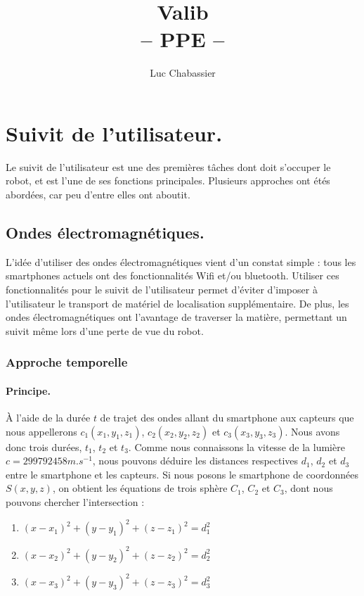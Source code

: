 \documentclass{article}
\title{Valib\\-- PPE --}
\author{Luc Chabassier}
\begin{document}
\maketitle
\tableofcontents

\section{Suivit de l'utilisateur.}
Le suivit de l'utilisateur est une des premières tâches dont doit s'occuper le robot, et est l'une de ses fonctions principales. Plusieurs approches ont étés abordées, car peu d'entre elles ont aboutit.

\subsection{Ondes électromagnétiques.}
L'idée d'utiliser des ondes électromagnétiques vient d'un constat simple : tous les smartphones actuels ont des fonctionnalités Wifi et/ou bluetooth. Utiliser ces fonctionnalités pour le suivit de l'utilisateur permet d'éviter d'imposer à l'utilisateur le transport de matériel de localisation supplémentaire. De plus, les ondes électromagnétiques ont l'avantage de traverser la matière, permettant un suivit même lors d'une perte de vue du robot.

\subsubsection{Approche temporelle}
\paragraph{Principe.}
À l'aide de la durée $t$ de trajet des ondes allant du smartphone aux capteurs que nous appellerons $c_1(x_1,y_1,z_1)$, $c_2(x_2,y_2,z_2)$ et $c_3(x_3,y_3,z_3)$. Nous avons donc trois durées, $t_1$, $t_2$ et $t_3$. Comme nous connaissons la vitesse de la lumière $c=299792458m.s^{-1}$, nous pouvons déduire les distances respectives $d_1$, $d_2$ et $d_3$ entre le smartphone et les capteurs. Si nous posons le smartphone de coordonnées $S(x,y,z)$, on obtient les équations de trois sphère $C_1$, $C_2$ et $C_3$, dont nous pouvons chercher l'intersection :
\begin{enumerate}
    \item $(x-x_1)^2 + (y-y_1)^2 + (z-z_1)^2 = d_1^2$
    \item $(x-x_2)^2 + (y-y_2)^2 + (z-z_2)^2 = d_2^2$
    \item $(x-x_3)^2 + (y-y_3)^2 + (z-z_3)^2 = d_3^2$
\end{enumerate}
\end{document}
